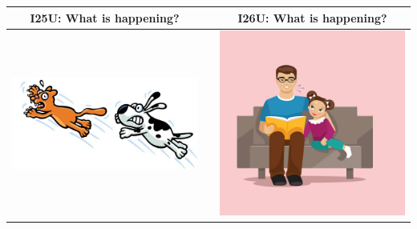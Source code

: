 \documentclass[12pt,notitlepage]{article}
\begin{document}
\begin{center}
\begin{tabular}{|c|c|c|}
\hline
I25U: What is happening? && I26U: What is happening? \\
\hline
\includegraphics[width=20em,trim=0 0 0 -3]{figures/I25.jpg} & & \includegraphics[width=20em,trim=0 0 0 -3]{figures/I26.jpg} \\
\hline
\end{tabular}
\vspace{1em} \\



\end{center}
\end{document}

